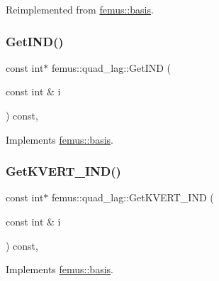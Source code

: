 Reimplemented from \mbox{\hyperlink{classfemus_1_1basis_a2ba867dcfa634c47f1c52caddd9bfdba}{femus\+::basis}}.

\mbox{\label{classfemus_1_1quad__lag_a363f9b8e94df40dddec713a4a08350a9}} 
\subsubsection{\texorpdfstring{Get\+I\+N\+D()}{GetIND()}}
{\footnotesize\ttfamily const int$\ast$ femus\+::quad\+\_\+lag\+::\+Get\+I\+ND (\begin{DoxyParamCaption}\item[{const int \&}]{i }\end{DoxyParamCaption}) const\hspace{0.3cm}{\ttfamily [inline]}, {\ttfamily [virtual]}}



Implements \mbox{\hyperlink{classfemus_1_1basis_a3f63ad97ce70cd4a1196ede69f1f144b}{femus\+::basis}}.

\mbox{\label{classfemus_1_1quad__lag_ab5c2233d78efd00452fabdaf9eb5c942}} 
\subsubsection{\texorpdfstring{Get\+K\+V\+E\+R\+T\+\_\+\+I\+N\+D()}{GetKVERT\_IND()}}
{\footnotesize\ttfamily const int$\ast$ femus\+::quad\+\_\+lag\+::\+Get\+K\+V\+E\+R\+T\+\_\+\+I\+ND (\begin{DoxyParamCaption}\item[{const int \&}]{i }\end{DoxyParamCaption}) const\hspace{0.3cm}{\ttfamily [inline]}, {\ttfamily [virtual]}}



Implements \mbox{\hyperlink{classfemus_1_1basis_a95ceb3feae4c484b0baa6a4d35d38909}{femus\+::basis}}.

\mbox{\label{classfemus_1_1quad__lag_ad1d8e10798242454170be69efd303523}} 
